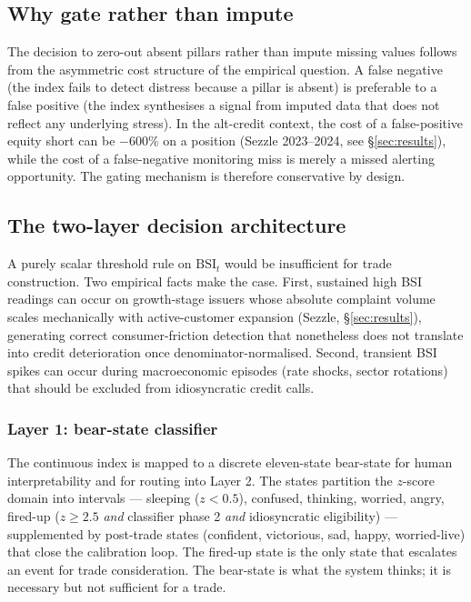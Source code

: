 \documentclass[11pt,a4paper]{article}
\begin{document}
\subsection{Why gate rather than impute}

The decision to zero-out absent pillars rather than impute missing values follows from the asymmetric cost structure of the empirical question. A false negative (the index fails to detect distress because a pillar is absent) is preferable to a false positive (the index synthesises a signal from imputed data that does not reflect any underlying stress). In the alt-credit context, the cost of a false-positive equity short can be $-600\%$ on a position (Sezzle 2023--2024, see §\ref{sec:results}), while the cost of a false-negative monitoring miss is merely a missed alerting opportunity. The gating mechanism is therefore conservative by design.

\subsection{The two-layer decision architecture}

A purely scalar threshold rule on $\text{BSI}_t$ would be insufficient for trade construction. Two empirical facts make the case. First, sustained high BSI readings can occur on growth-stage issuers whose absolute complaint volume scales mechanically with active-customer expansion (Sezzle, §\ref{sec:results}), generating correct consumer-friction detection that nonetheless does not translate into credit deterioration once denominator-normalised. Second, transient BSI spikes can occur during macroeconomic episodes (rate shocks, sector rotations) that should be excluded from idiosyncratic credit calls.

\subsubsection{Layer 1: bear-state classifier}

The continuous index is mapped to a discrete eleven-state bear-state for human interpretability and for routing into Layer 2. The states partition the $z$-score domain into intervals --- sleeping ($z<0.5$), confused, thinking, worried, angry, fired-up ($z \ge 2.5$ \emph{and} classifier phase 2 \emph{and} idiosyncratic eligibility) --- supplemented by post-trade states (confident, victorious, sad, happy, worried-live) that close the calibration loop. The fired-up state is the only state that escalates an event for trade consideration. The bear-state is what the system thinks; it is necessary but not sufficient for a trade.
\end{document}
